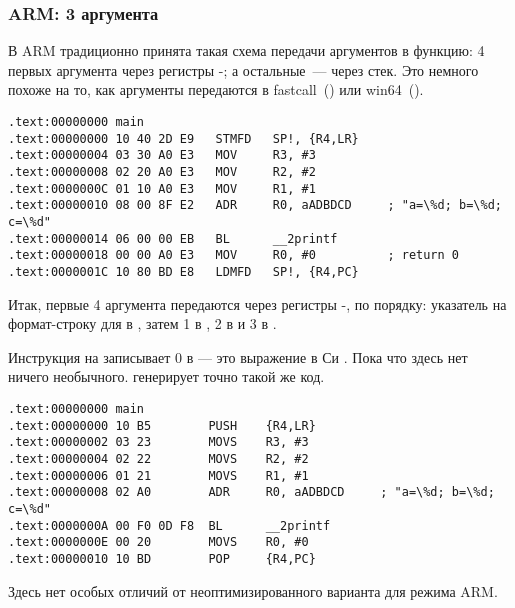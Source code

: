 \subsubsection{ARM: 3 аргумента}

В ARM традиционно принята такая схема передачи аргументов в функцию: 
4 первых аргумента через регистры -; а остальные~--- через стек.
Это немного похоже на то, как аргументы передаются в 
fastcall~() или win64~().


\mysubparagraph{\NonOptimizingKeilVI (\ARMMode)}

\begin{lstlisting}[caption=\NonOptimizingKeilVI (\ARMMode),style=customasmARM]
.text:00000000 main
.text:00000000 10 40 2D E9   STMFD   SP!, {R4,LR}
.text:00000004 03 30 A0 E3   MOV     R3, #3
.text:00000008 02 20 A0 E3   MOV     R2, #2
.text:0000000C 01 10 A0 E3   MOV     R1, #1
.text:00000010 08 00 8F E2   ADR     R0, aADBDCD     ; "a=\%d; b=\%d; c=\%d"
.text:00000014 06 00 00 EB   BL      __2printf
.text:00000018 00 00 A0 E3   MOV     R0, #0          ; return 0
.text:0000001C 10 80 BD E8   LDMFD   SP!, {R4,PC}
\end{lstlisting}

Итак, первые 4 аргумента передаются через регистры -, по порядку: 
указатель на формат-строку для \printf
в , затем 1 в , 2 в  и 3 в .

Инструкция на  записывает 0 в  --- это выражение в Си .
Пока что здесь нет ничего необычного.
\OptimizingKeilVI генерирует точно такой же код.

\mysubparagraph{\OptimizingKeilVI (\ThumbMode)}

\begin{lstlisting}[caption=\OptimizingKeilVI (\ThumbMode),style=customasmARM]
.text:00000000 main
.text:00000000 10 B5        PUSH    {R4,LR}
.text:00000002 03 23        MOVS    R3, #3
.text:00000004 02 22        MOVS    R2, #2
.text:00000006 01 21        MOVS    R1, #1
.text:00000008 02 A0        ADR     R0, aADBDCD     ; "a=\%d; b=\%d; c=\%d"
.text:0000000A 00 F0 0D F8  BL      __2printf
.text:0000000E 00 20        MOVS    R0, #0
.text:00000010 10 BD        POP     {R4,PC}
\end{lstlisting}

Здесь нет особых отличий от неоптимизированного варианта для режима ARM.
\label{ARM_B_to_printf}

